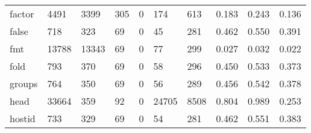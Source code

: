 \begin{longtable}{lp{1.3cm}p{1.3cm}p{1.3cm}p{1.3cm}p{1.3cm}p{1.3cm}p{1.3cm}p{1.3cm}p{1.3cm}}
factor    &                   4491 &                               3399 &                               305 &                                0 &                               174 &                             613 &                                0.183 &                                  0.243 &                                0.136 \\
false     &                    718 &                                323 &                                69 &                                0 &                                45 &                             281 &                                0.462 &                                  0.550 &                                0.391 \\
fmt       &                  13788 &                              13343 &                                69 &                                0 &                                77 &                             299 &                                0.027 &                                  0.032 &                                0.022 \\
fold      &                    793 &                                370 &                                69 &                                0 &                                58 &                             296 &                                0.450 &                                  0.533 &                                0.373 \\
groups    &                    764 &                                350 &                                69 &                                0 &                                56 &                             289 &                                0.456 &                                  0.542 &                                0.378 \\
head      &                  33664 &                                359 &                                92 &                                0 &                             24705 &                            8508 &                                0.804 &                                  0.989 &                                0.253 \\
hostid    &                    733 &                                329 &                                69 &                                0 &                                54 &                             281 &                                0.462 &                                  0.551 &                                0.383 \\

\end{longtable}

